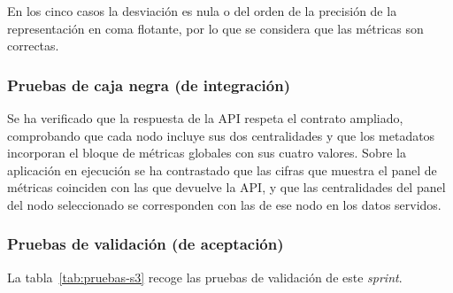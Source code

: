 En los cinco casos la desviación es nula o del orden de la precisión de la representación en coma
flotante, por lo que se considera que las métricas son correctas.

\subsubsection*{Pruebas de caja negra (de integración)}

Se ha verificado que la respuesta de la API respeta el contrato ampliado, comprobando que cada nodo
incluye sus dos centralidades y que los metadatos incorporan el bloque de métricas globales con sus
cuatro valores. Sobre la aplicación en ejecución se ha contrastado que las cifras que muestra el
panel de métricas coinciden con las que devuelve la API, y que las centralidades del panel del nodo
seleccionado se corresponden con las de ese nodo en los datos servidos.

\subsubsection*{Pruebas de validación (de aceptación)}

La tabla~\ref{tab:pruebas-s3} recoge las pruebas de validación de este \textit{sprint}.

